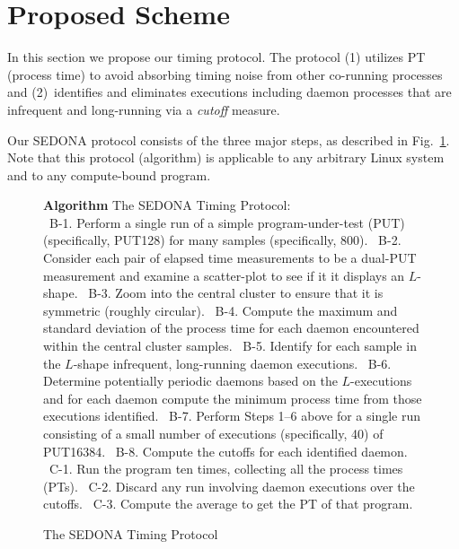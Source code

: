 \documentclass[letter]{ieice}
\begin{document}
\section{Proposed Scheme}
\label{sec:prop_appach}

{\color{blue}
In this section we propose our timing protocol. 
The protocol (1) utilizes PT (process time) to avoid absorbing timing noise from other co-running processes and (2)~identifies and eliminates executions including daemon processes that are infrequent and \hbox{long-running} via a {\em cutoff} measure. 

Our SEDONA protocol consists of the three major steps, as described in Fig.~\ref{alg:find}. 
Note that this protocol (algorithm) is applicable to any arbitrary Linux system and to any compute-bound program.
}

\vspace{-0.2in}
\begin{figure}[h]
\begin{center}
\begin{algorithmic}
{\bf Algorithm} The SEDONA Timing Protocol: \\
{\color{blue}
\STATE  \ B-1. Perform a single run of a simple program-under-test (PUT) (specifically, PUT128) for many samples (specifically, 800).
\STATE  \ B-2. Consider each pair of elapsed time measurements to be a dual-PUT measurement and examine a scatter-plot to see if it it displays an $L$-shape.
\STATE  \ B-3. Zoom into the central cluster to ensure that it is symmetric (roughly circular).
\STATE  \ B-4. Compute the maximum and standard deviation of the process time for each daemon encountered within the central cluster samples.
\STATE  \ B-5. Identify for each sample in the $L$-shape infrequent, long-running daemon executions. 
\STATE  \ B-6. Determine potentially periodic daemons based on the $L$-executions and for each daemon compute the minimum process time from those executions identified. 
\STATE  \ B-7. Perform Steps 1--6 above for a single run consisting of a small number of executions (specifically, 40) of PUT16384.  
\STATE  \ B-8. Compute the cutoffs for each identified daemon. 
\STATE  \ C-1. Run the program ten times, collecting all the process times (PTs). 
\STATE  \ C-2. Discard any run involving daemon executions over the cutoffs.
\STATE  \ C-3. Compute the average to get the PT of that program.
}
\end{algorithmic}
\end{center}
\caption{The SEDONA Timing Protocol\label{alg:find}}
\end{figure}
\end{document}
